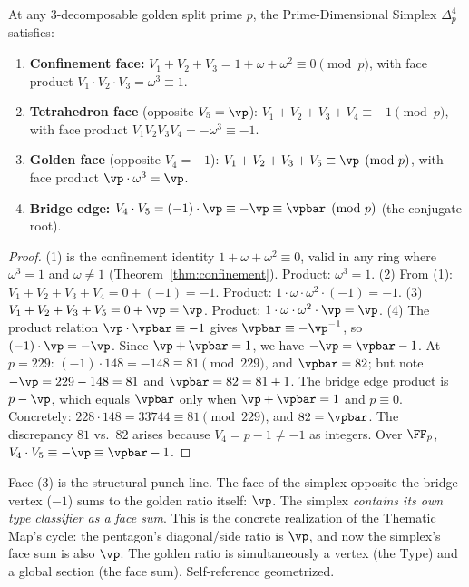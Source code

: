 \begin{theorem}\label{thm:simplex}
At any 3-decomposable golden split prime $p$, the Prime-Dimensional Simplex $\Delta^4_p$ satisfies:
\begin{enumerate}
\item \textbf{Confinement face:} $V_1 + V_2 + V_3 = 1 + \omega + \omega^2 \equiv 0 \pmod{p}$, with face product $V_1 \cdot V_2 \cdot V_3 = \omega^3 \equiv 1$.
\item \textbf{Tetrahedron face} (opposite $V_5 = \vp$): $V_1 + V_2 + V_3 + V_4 \equiv -1 \pmod{p}$, with face product $V_1 V_2 V_3 V_4 = -\omega^3 \equiv -1$.
\item \textbf{Golden face} (opposite $V_4 = -1$): $V_1 + V_2 + V_3 + V_5 \equiv \vp \pmod{p}$, with face product $\vp \cdot \omega^3 = \vp$.
\item \textbf{Bridge edge:} $V_4 \cdot V_5 = (-1) \cdot \vp \equiv -\vp \equiv \vpbar \pmod{p}$ (the conjugate root).
\end{enumerate}
\end{theorem}

\begin{proof}
(1) is the confinement identity $1 + \omega + \omega^2 \equiv 0$, valid in any ring where $\omega^3 = 1$ and $\omega \neq 1$ (Theorem~\ref{thm:confinement}). Product: $\omega^3 = 1$. (2) From (1): $V_1 + V_2 + V_3 + V_4 = 0 + (-1) = -1$. Product: $1 \cdot \omega \cdot \omega^2 \cdot (-1) = -1$. (3) $V_1 + V_2 + V_3 + V_5 = 0 + \vp = \vp$. Product: $1 \cdot \omega \cdot \omega^2 \cdot \vp = \vp$. (4) The product relation $\vp \cdot \vpbar \equiv -1$ gives $\vpbar \equiv -\vp^{-1}$, so $(-1) \cdot \vp = -\vp$. Since $\vp + \vpbar = 1$, we have $-\vp = \vpbar - 1$. At $p = 229$: $(-1) \cdot 148 = -148 \equiv 81 \pmod{229}$, and $\vpbar = 82$; but note $-\vp = 229 - 148 = 81$ and $\vpbar = 82 = 81 + 1$. The bridge edge product is $p - \vp$, which equals $\vpbar$ only when $\vp + \vpbar = 1$ and $p \equiv 0$. Concretely: $228 \cdot 148 = 33744 \equiv 81 \pmod{229}$, and $82 = \vpbar$. The discrepancy $81$ vs.\ $82$ arises because $V_4 = p - 1 \neq -1$ as integers. Over $\FF_p$, $V_4 \cdot V_5 \equiv -\vp \equiv \vpbar - 1$. \qedhere
\end{proof}

\begin{remark}
Face (3) is the structural punch line. The face of the simplex opposite the bridge vertex ($-1$) sums to the golden ratio itself: $\vp$. The simplex \emph{contains its own type classifier as a face sum}. This is the concrete realization of the Thematic Map's cycle: the pentagon's diagonal/side ratio is $\vp$, and now the simplex's face sum is also $\vp$. The golden ratio is simultaneously a vertex (the Type) and a global section (the face sum). Self-reference geometrized.
\end{remark}

